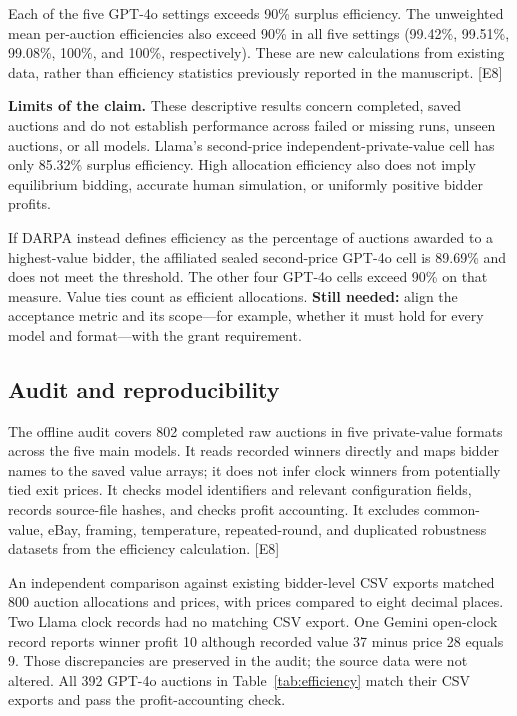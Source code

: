 \documentclass[11pt,letterpaper]{article}
\newcommand{\evidence}[1]{\textnormal{[E#1]}}
\begin{document}
Each of the five GPT-4o settings exceeds 90\% surplus efficiency. The
unweighted mean per-auction efficiencies also exceed 90\% in all five settings
(99.42\%, 99.51\%, 99.08\%, 100\%, and 100\%, respectively).
These are new calculations from existing data, rather than efficiency
statistics previously reported in the manuscript. \evidence{8}

\textbf{Limits of the claim.} These descriptive results concern completed,
saved auctions and do not establish performance across failed or missing runs,
unseen auctions, or all models. Llama's second-price independent-private-value
cell has only 85.32\% surplus efficiency. High allocation efficiency also
does not imply equilibrium bidding, accurate human simulation, or uniformly
positive bidder profits.

If DARPA instead defines efficiency as the percentage of auctions awarded to
a highest-value bidder, the affiliated sealed second-price GPT-4o cell is
89.69\% and does not meet the threshold. The other four GPT-4o cells exceed
90\% on that measure. Value ties count as efficient allocations.
\textbf{Still needed:} align the acceptance metric and its scope---for example,
whether it must hold for every model and format---with the grant requirement.

\subsection{Audit and reproducibility}

The offline audit covers 802 completed raw auctions in five private-value
formats across the five main models. It reads recorded winners directly and
maps bidder names to the saved value arrays; it does not infer clock winners
from potentially tied exit prices. It checks model identifiers and relevant
configuration fields, records source-file hashes, and checks profit accounting.
It excludes common-value, eBay, framing, temperature, repeated-round, and
duplicated robustness datasets from the efficiency calculation. \evidence{8}

An independent comparison against existing bidder-level CSV exports matched
800 auction allocations and prices, with prices compared to eight decimal
places. Two Llama clock records had no matching CSV export. One Gemini open-clock
record reports winner profit 10 although recorded value 37 minus price 28
equals 9. Those discrepancies are preserved in the audit; the source data
were not altered. All 392 GPT-4o auctions in Table~\ref{tab:efficiency} match
their CSV exports and pass the profit-accounting check.
\end{document}

